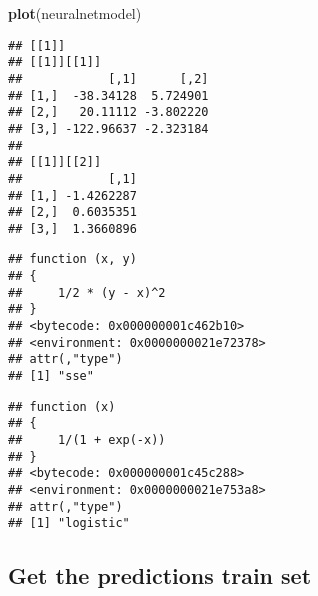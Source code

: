 \documentclass[
]{book}
\newenvironment{Shaded}{\begin{snugshade}}{\end{snugshade}}
\newcommand{\KeywordTok}[1]{\textcolor[rgb]{0.13,0.29,0.53}{\textbf{#1}}}
\newcommand{\NormalTok}[1]{#1}
\newcommand{\OperatorTok}[1]{\textcolor[rgb]{0.81,0.36,0.00}{\textbf{#1}}}
\begin{document}
\begin{Shaded}
\begin{Highlighting}[]
\KeywordTok{plot}\NormalTok{(neuralnetmodel)}
\end{Highlighting}
\end{Shaded}

\begin{Shaded}
\end{Shaded}

\begin{verbatim}
## [[1]]
## [[1]][[1]]
##            [,1]      [,2]
## [1,]  -38.34128  5.724901
## [2,]   20.11112 -3.802220
## [3,] -122.96637 -2.323184
## 
## [[1]][[2]]
##            [,1]
## [1,] -1.4262287
## [2,]  0.6035351
## [3,]  1.3660896
\end{verbatim}

\begin{Shaded}
\end{Shaded}

\begin{verbatim}
## function (x, y) 
## {
##     1/2 * (y - x)^2
## }
## <bytecode: 0x000000001c462b10>
## <environment: 0x0000000021e72378>
## attr(,"type")
## [1] "sse"
\end{verbatim}

\begin{Shaded}
\end{Shaded}

\begin{verbatim}
## function (x) 
## {
##     1/(1 + exp(-x))
## }
## <bytecode: 0x000000001c45c288>
## <environment: 0x0000000021e753a8>
## attr(,"type")
## [1] "logistic"
\end{verbatim}

\hypertarget{get-the-predictions-train-set}{%
\subsection{Get the predictions train set}\label{get-the-predictions-train-set}}
\end{document}
